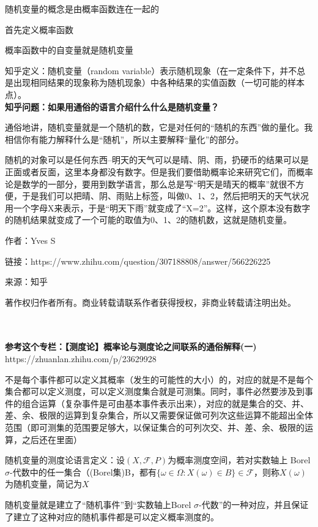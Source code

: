 \documentclass[UTF8,10pt]{book}
\begin{document}
                {\kaishu 随机变量的概念是由概率函数连在一起的
                
                首先定义概率函数
                
                概率函数中的自变量就是随机变量
                }
            
            	
            	{\kaishu 知乎定义：随机变量（random variable）表示随机现象（在一定条件下，并不总是出现相同结果的现象称为随机现象）中各种结果的实值函数（一切可能的样本点）。}\\
            	
           		\textbf{知乎问题：如果用通俗的语言介绍什么什么是随机变量？}
            
            	{\kaishu 
            	通俗地讲，随机变量就是一个随机的数，它是对任何的“随机的东西”做的量化。我相信你有能力解释什么是“随机”，所以主要解释“量化”的部分。
            	
            	随机的对象可以是任何东西--明天的天气可以是晴、阴、雨，扔硬币的结果可以是正面或者反面，这里本身都没有数字。但是我们要借助概率论来研究它们，而概率论是数学的一部分，要用到数学语言，那么总是写“明天是晴天的概率”就很不方便，于是我们可以把晴、阴、雨贴上标签，叫做0、1、2，然后把明天的天气状况用一个字母X来表示，于是“明天下雨”就变成了“X=2”。这样，这个原本没有数字的随机结果就变成了一个可能的取值为0、1、2的随机数，这就是随机变量。
            	
            	作者：Yves S
            	
            	链接：https://www.zhihu.com/question/307188808/answer/566226225
            	
            	来源：知乎
            	
            	著作权归作者所有。商业转载请联系作者获得授权，非商业转载请注明出处。
            	}\\
            \\
            	
            	
            	\textbf{参考这个专栏：【测度论】概率论与测度论之间联系的通俗解释(一)} https://zhuanlan.zhihu.com/p/23629928
            	
            	{\kaishu 不是每个事件都可以定义其概率（发生的可能性的大小）的，对应的就是不是每个集合都可以定义测度，可以定义测度集合就是可测集。同时，事件必然要涉及到事件的组合运算（复杂事件是可由基本事件表示出来），对应的就是集合的交、并、差、余、极限的运算到复杂集合，所以又需要保证做可列次这些运算不能超出全体范围（即可测集的范围要足够大，以保证集合的可列次交、并、差、余、极限的运算，之后还在里面）
            	
            	随机变量的测度论语言定义：设$ (X, \mathcal{F}, P) $为概率测度空间，若对实数轴上 Borel $\sigma$-代数中的任一集合（(Borel集)B，都有$\{\omega \in \Omega: X(\omega) \in B\} \in \mathcal{F}$，则称$X(\omega)$为随机变量，简记为$X$
            	
            	随机变量就是建立了“随机事件”到“实数轴上Borel $\sigma$-代数”的一种对应，并且保证了建立了这种对应的随机事件都是可以定义概率测度的。}
            	\\
            	
\end{document}
